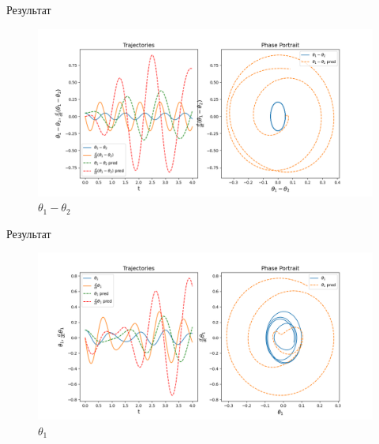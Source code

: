 \documentclass{beamer}
\begin{document}

\begin{frame}{Результат}

    \begin{figure}
        \centering
        \includegraphics[width = 1 \textwidth]{images/Graph_difference.png}
        \caption{$\theta_1 - \theta_2$}
    \end{figure}
  
\end{frame}


\begin{frame}{Результат}

    \begin{figure}
        \centering
        \includegraphics[width = 1 \textwidth]{images/Graph_1.png}
        \caption{$\theta_1$}
    \end{figure}

\end{frame}

\end{document}
